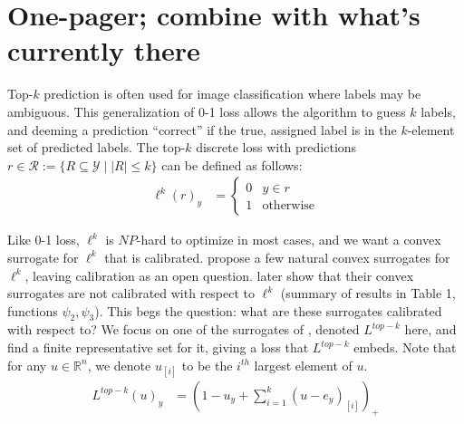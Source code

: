 \documentclass[12pt]{article}
\newcommand{\reals}{\mathbb{R}}
\newcommand{\simplex}{\Delta_\Y}
\newcommand{\R}{\mathcal{R}}
\newcommand{\Y}{\mathcal{Y}}
\newcommand{\risk}[1]{\underline{#1}}
\newcommand{\inprod}[2]{\langle #1, #2 \rangle}%
\DeclareMathOperator*{\argmax}{arg\,max}
\begin{document}
%


\section{One-pager; combine with what's currently there}
Top-$k$ prediction is often used for image classification where labels may be ambiguous.
This generalization of 0-1 loss allows the algorithm to guess $k$ labels, and deeming a prediction ``correct'' if the true, assigned label is in the $k$-element set of predicted labels.
The top-$k$ discrete loss with predictions $r \in \R := \{R \subseteq \Y \mid |R| \leq k\}$ can be defined as follows:
\begin{align*}
\ell^k(r)_y &=
\begin{cases}
0 & y \in r \\
1 & \text{otherwise}
\end{cases}
\end{align*}

Like 0-1 loss, $\ell^k$ is $NP$-hard to optimize in most cases, and we want a convex surrogate for $\ell^k$ that is calibrated.
\citet{lapin2015top, lapin2015loss} propose a few natural convex surrogates for $\ell^k$, leaving calibration as an open question.
\citet{yang2020consistency} later show that their convex surrogates are not calibrated with respect to $\ell^k$ (summary of results in Table 1, functions $\psi_2, \psi_3$).
This begs the question: what are these surrogates calibrated with respect to?
We focus on one of the surrogates of \citet{lapin2015top,lapin2015loss}, denoted $L^{top-k}$ here, and find a finite representative set for it, giving a loss that $L^{top-k}$ embeds.
Note that for any $u \in \reals^n$, we denote $u_{[i]}$ to be the $i^{th}$ largest element of $u$.
\begin{align*}
L^{top-k}(u)_y &= \left(1 - u_y + \sum_{i=1}^k(u-e_y)_{[i]}\right)_+
\end{align*}
\end{document}
